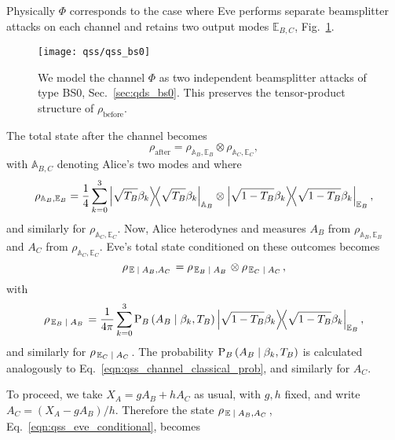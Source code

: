 Physically $\Phi$ corresponds to the case where Eve performs separate beamsplitter attacks on each channel and retains two output modes $\mathbb{E}_{B, C}$, Fig.~\ref{fig:qss_bs0_attack}.

\begin{figure}[htp]
\captionsetup{width=\linewidth}
\centering
\texttt{[image: qss/qss\_bs0]}
\caption{\label{fig:qss_bs0_attack} We model the channel $\Phi$ as two independent beamsplitter attacks of type BS$0$, Sec.~\ref{sec:qds_bs0}. This preserves the tensor-product structure of $\rho_{\text{before}}$.}
\end{figure}


The total state after the channel becomes
\begin{equation}
\rho_{\text{after}} = \rho_{\mathbb{A}_B, \mathbb{E}_B} \otimes \rho_{\mathbb{A}_C, \mathbb{E}_C},
\end{equation}
with $\mathbb{A}_{B, C}$ denoting Alice's two modes and where
\begin{equation}
\rho_{\mathbb{A}_B, \mathbb{E}_B} = \frac{1}{4} \sum_{k=0}^3 \dyad{\sqrt{T_B} \beta_k}_{\mathbb{A}_B} \otimes \dyad{\sqrt{1-T_B} \beta_k}_{\mathbb{E}_B},
\end{equation}
and similarly for $\rho_{\mathbb{A}_C, \mathbb{E}_C}$. Now, Alice heterodynes and measures $A_B$ from $\rho_{\mathbb{A}_B, \mathbb{E}_B}$ and $A_C$ from $\rho_{\mathbb{A}_C, \mathbb{E}_C}$. Eve's total state conditioned on these outcomes becomes 
\begin{equation}\label{eqn:qss_eve_conditional}
\rho_{\left.\mathbb{E} \; \middle| \; A_B, A_C\right.} = \rho_{\left.\mathbb{E}_B \; \middle| \; A_B\right.} \otimes \rho_{\left. \mathbb{E}_C \; \middle| \; A_C\right.},
\end{equation}
with
\begin{equation}
\rho_{\left.\mathbb{E}_B \given A_B\right.} = \frac{1}{4 \pi} \sum_{k=0}^3 \text{P}_B\left(A_B \given \beta_k, T_B\right) \dyad{\sqrt{1-T_B} \beta_k}_{\mathbb{E}_B},
\end{equation}
and similarly for $\rho_{\left.\mathbb{E}_C \; \middle| \; A_C\right.}$. The probability $\text{P}_B\left(A_B \; \middle| \; \beta_k, T_B\right)$ is calculated analogously to Eq.~\ref{eqn:qss_channel_classical_prob}, and similarly for $A_C$.

To proceed, we take $X_A = g A_B + h A_C$ as usual, with $g, h$ fixed, and write $A_C = \left(X_A - g A_B\right)/h$. Therefore the state $\rho_{\left.\mathbb{E} \; \middle| \; A_B, A_C\right.}$, Eq.~\ref{eqn:qss_eve_conditional}, becomes


